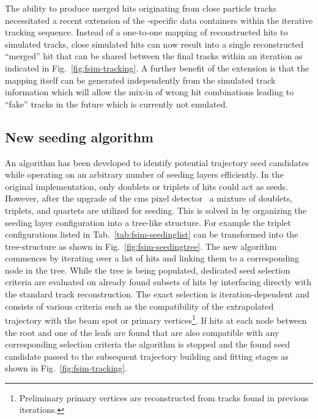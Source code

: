 The ability to produce merged hits originating from close particle tracks necessitated a recent extension of the \FSIM{}-specific data containers within the iterative tracking sequence. Instead of a one-to-one mapping of reconstructed hits to simulated tracks, close simulated hits can now result into a single reconstructed ``merged'' hit that can be shared between the final tracks within an iteration as indicated in Fig.~\ref{fig:fsim-tracking}. A further benefit of the extension is that the mapping itself can be generated independently from the simulated track information which will allow the mix-in of wrong hit combinations leading to ``fake'' tracks in the future which is currently not emulated.


\subsection{New seeding algorithm}
\label{sec:fsim-seeding}

An algorithm has been developed to identify potential trajectory seed candidates while operating on an arbitrary number of seeding layers efficiently. In the original implementation, only doublets or triplets of hits could act as seeds. However, after the upgrade of the \gls{cms} pixel detector~\cite{Dominguez:1481838} a mixture of doublets, triplets, and quartets are utilized for seeding. This is solved in \FSIM by organizing the seeding layer configuration into a tree-like structure. For example the triplet configurations listed in Tab.~\ref{tab:fsim-seedinglist} can be transformed into the tree-structure as shown in Fig.~\ref{fig:fsim-seedingtree}. The new algorithm commences by iterating over a list of hits and linking them to a corresponding node in the tree. While the tree is being populated, dedicated seed selection criteria are evaluated on already found subsets of hits by interfacing directly with the standard track reconstruction. The exact selection is iteration-dependent and consists of various criteria such as the compatibility of the extrapolated trajectory with the beam spot or primary vertices\footnote{Preliminary primary vertices are reconstructed from tracks found in previous iterations.}. If hits at each node between the root and one of the leafs are found that are also compatible with any corresponding selection criteria the algorithm is stopped and the found seed candidate passed to the subsequent trajectory building and fitting stages as shown in Fig.~\ref{fig:fsim-tracking}.

